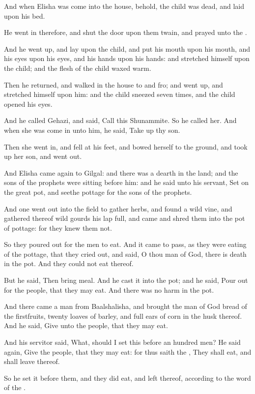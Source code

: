 \verse And when Elisha was come into the house, behold, the child was dead, and laid upon his bed.

\verse He went in therefore, and shut the door upon them twain, and prayed unto the \LORD.

\verse And he went up, and lay upon the child, and put his mouth upon his mouth, and his eyes upon his eyes, and his hands upon his hands: and stretched himself upon the child; and the flesh of the child waxed warm.

\verse Then he returned, and walked in the house to and fro; and went up, and stretched himself upon him: and the child sneezed seven times, and the child opened his eyes.

\verse And he called Gehazi, and said, Call this Shunammite. So he called her. And when she was come in unto him, he said, Take up thy son.

\verse Then she went in, and fell at his feet, and bowed herself to the ground, and took up her son, and went out.

\verse And Elisha came again to Gilgal: and there was a dearth in the land; and the sons of the prophets were sitting before him: and he said unto his servant, Set on the great pot, and seethe pottage for the sons of the prophets.

\verse And one went out into the field to gather herbs, and found a wild vine, and gathered thereof wild gourds his lap full, and came and shred them into the pot of pottage: for they knew them not.

\verse So they poured out for the men to eat. And it came to pass, as they were eating of the pottage, that they cried out, and said, O thou man of God, there is death in the pot. And they could not eat thereof.

\verse But he said, Then bring meal. And he cast it into the pot; and he said, Pour out for the people, that they may eat. And there was no harm in the pot.

\verse And there came a man from Baalshalisha, and brought the man of God bread of the firstfruits, twenty loaves of barley, and full ears of corn in the husk thereof. And he said, Give unto the people, that they may eat.

\verse And his servitor said, What, should I set this before an hundred men?  He said again, Give the people, that they may eat: for thus saith the \LORD, They shall eat, and shall leave thereof.

\verse So he set it before them, and they did eat, and left thereof, according to the word of the \LORD.


